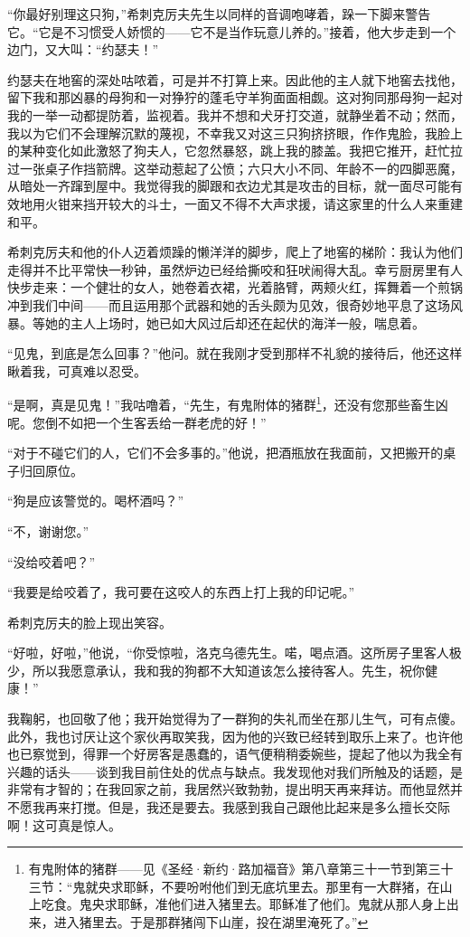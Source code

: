 \par “你最好别理这只狗，”希刺克厉夫先生以同样的音调咆哮着，跺一下脚来警告它。“它是不习惯受人娇惯的——它不是当作玩意儿养的。”接着，他大步走到一个边门，又大叫：“约瑟夫！”
\par 约瑟夫在地窖的深处咕哝着，可是并不打算上来。因此他的主人就下地窖去找他，留下我和那凶暴的母狗和一对狰狞的蓬毛守羊狗面面相觑。这对狗同那母狗一起对我的一举一动都提防着，监视着。我并不想和犬牙打交道，就静坐着不动；然而，我以为它们不会理解沉默的蔑视，不幸我又对这三只狗挤挤眼，作作鬼脸，我脸上的某种变化如此激怒了狗夫人，它忽然暴怒，跳上我的膝盖。我把它推开，赶忙拉过一张桌子作挡箭牌。这举动惹起了公愤；六只大小不同、年龄不一的四脚恶魔，从暗处一齐蹿到屋中。我觉得我的脚跟和衣边尤其是攻击的目标，就一面尽可能有效地用火钳来挡开较大的斗士，一面又不得不大声求援，请这家里的什么人来重建和平。
\par 希刺克厉夫和他的仆人迈着烦躁的懒洋洋的脚步，爬上了地窖的梯阶：我认为他们走得并不比平常快一秒钟，虽然炉边已经给撕咬和狂吠闹得大乱。幸亏厨房里有人快步走来：一个健壮的女人，她卷着衣裙，光着胳臂，两颊火红，挥舞着一个煎锅冲到我们中间——而且运用那个武器和她的舌头颇为见效，很奇妙地平息了这场风暴。等她的主人上场时，她已如大风过后却还在起伏的海洋一般，喘息着。
\par “见鬼，到底是怎么回事？”他问。就在我刚才受到那样不礼貌的接待后，他还这样瞅着我，可真难以忍受。
\par “是啊，真是见鬼！”我咕噜着，“先生，有鬼附体的猪群\footnote{有鬼附体的猪群——见《圣经·新约·路加福音》第八章第三十一节到第三十三节：“鬼就央求耶稣，不要吩咐他们到无底坑里去。那里有一大群猪，在山上吃食。鬼央求耶稣，准他们进入猪里去。耶稣准了他们。鬼就从那人身上出来，进入猪里去。于是那群猪闯下山崖，投在湖里淹死了。”}，还没有您那些畜生凶呢。您倒不如把一个生客丢给一群老虎的好！”
\par “对于不碰它们的人，它们不会多事的。”他说，把酒瓶放在我面前，又把搬开的桌子归回原位。
\par “狗是应该警觉的。喝杯酒吗？”
\par “不，谢谢您。”
\par “没给咬着吧？”
\par “我要是给咬着了，我可要在这咬人的东西上打上我的印记呢。”
\par 希刺克厉夫的脸上现出笑容。
\par “好啦，好啦，”他说，“你受惊啦，洛克乌德先生。喏，喝点酒。这所房子里客人极少，所以我愿意承认，我和我的狗都不大知道该怎么接待客人。先生，祝你健康！”
\par 我鞠躬，也回敬了他；我开始觉得为了一群狗的失礼而坐在那儿生气，可有点傻。此外，我也讨厌让这个家伙再取笑我，因为他的兴致已经转到取乐上来了。也许他也已察觉到，得罪一个好房客是愚蠢的，语气便稍稍委婉些，提起了他以为我全有兴趣的话头——谈到我目前住处的优点与缺点。我发现他对我们所触及的话题，是非常有才智的；在我回家之前，我居然兴致勃勃，提出明天再来拜访。而他显然并不愿我再来打搅。但是，我还是要去。我感到我自己跟他比起来是多么擅长交际啊！这可真是惊人。


